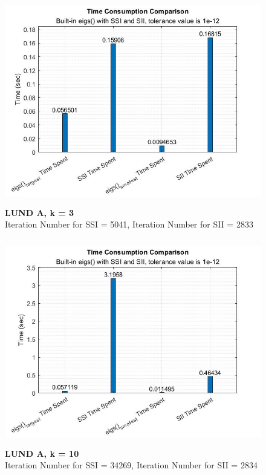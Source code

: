 \documentclass[12pt]{article}
\begin{document}
\begin{figure}[H]
	\centerline{\includegraphics[height=9cm, width=12cm]{plot3lunda.jpg}}
	\caption{\textbf{LUND A, k = 3} \\ Iteration Number for SSI = 5041, Iteration Number for SII = 2833}
	\label{fig5}
\end{figure}

\begin{figure}[H]
	\centerline{\includegraphics[height=9cm, width=12cm]{plot10lunda.jpg}}
	\caption{\textbf{LUND A, k = 10} \\ Iteration Number for SSI = 34269, Iteration Number for SII = 2834}
	\label{fig6}
\end{figure}
\end{document}
